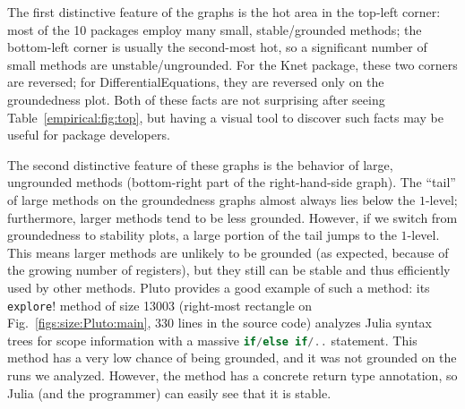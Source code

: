 \documentclass[oneside,openright,titlepage,numbers=noenddot,%
headinclude,footinclude,cleardoublepage=empty,abstract=on,
BCOR=5mm,paper=a4,fontsize=11pt,
dvipsnames
]{scrreprt}
\renewcommand{\c}[1]{\lstinline[language=Julia]!#1!\xspace}
\begin{document}
The first distinctive feature of the graphs is the hot area in the top-left
corner: most of the 10 packages employ many small, stable/grounded methods;
the bottom-left corner is usually the second-most hot, so a significant number
of small methods are unstable/ungrounded. For the Knet package,
these two corners are reversed; for DifferentialEquations, they are reversed
only on the groundedness plot. Both of these facts are not surprising after seeing
Table~\ref{empirical:fig:top}, but having a visual tool to discover such facts
may be useful for package developers.

The second distinctive feature of these graphs is the behavior of large,
ungrounded methods (bottom-right part of the right-hand-side graph). The
``tail'' of large methods on the groundedness graphs almost always lies below
the $1$-level; furthermore, larger methods tend to be less grounded.
However, if we switch from groundedness to stability plots, a large portion of
the tail jumps to the $1$-level. This means larger methods are unlikely to be
grounded (as expected, because of the growing number of registers), but they
still can be stable and thus efficiently used by other methods. Pluto provides a
good example of such a method: its \c{explore!} method of size 13003 (right-most
rectangle on Fig.~\ref{figs:size:Pluto:main}, 330 lines in the source code) analyzes
Julia syntax trees for scope information with a massive \c{if/else if/..} statement.
This method has a very low chance of being grounded, and it was not grounded on the
runs we analyzed. However, the method has a concrete return type annotation, so
Julia (and the programmer) can easily see that it is stable.


\end{document}

